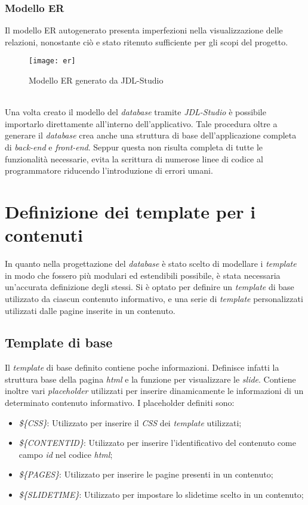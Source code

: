 \subsubsection{Modello ER}
Il modello ER autogenerato presenta imperfezioni nella visualizzazione delle relazioni, nonostante ciò e stato ritenuto sufficiente per gli scopi del progetto.
\begin{figure}[h]
    \begin{center}
    \texttt{[image: er]}
    \caption{Modello ER generato da JDL-Studio}
    \label{fig:figure19}
    \end{center}
\end{figure}
\\Una volta creato il modello del \textit{database} tramite \textit{JDL-Studio} è possibile importarlo direttamente all'interno dell'applicativo.
Tale procedura oltre a generare il \textit{database} crea anche una struttura di base dell'applicazione completa di \textit{back-end} e \textit{front-end}. Seppur questa non risulta completa di tutte le funzionalità necessarie, evita la scrittura di numerose linee di codice al programmatore riducendo l'introduzione di errori umani.
\section{Definizione dei template per i contenuti}
In quanto nella progettazione del \textit{database} è stato scelto di modellare i \textit{template} in modo che fossero più modulari ed estendibili possibile, è stata necessaria un'accurata definizione degli stessi. Si è optato per definire un \textit{template} di base utilizzato da ciascun contenuto informativo, e una serie di \textit{template} personalizzati utilizzati dalle pagine inserite in un contenuto.
\subsection{Template di base}
Il \textit{template} di base definito contiene poche informazioni. Definisce infatti la struttura base della pagina \textit{html} e la funzione per visualizzare le \textit{slide}. Contiene inoltre vari \textit{placeholder} utilizzati per inserire dinamicamente le informazioni di un determinato contenuto informativo.
I placeholder definiti sono: 
\begin{itemize}
    \item \textit{\$\{CSS\}}: Utilizzato per inserire il \textit{CSS} dei \textit{template} utilizzati;
    \item \textit{\$\{CONTENTID\}}: Utilizzato per inserire l’identificativo del contenuto come campo \textit{id} nel codice \textit{html};
    \item \textit{\$\{PAGES\}}: Utilizzato per inserire le pagine presenti in un contenuto;
    \item \textit{\$\{SLIDETIME\}}: Utilizzato per impostare lo slidetime scelto in un contenuto;
\end{itemize}
